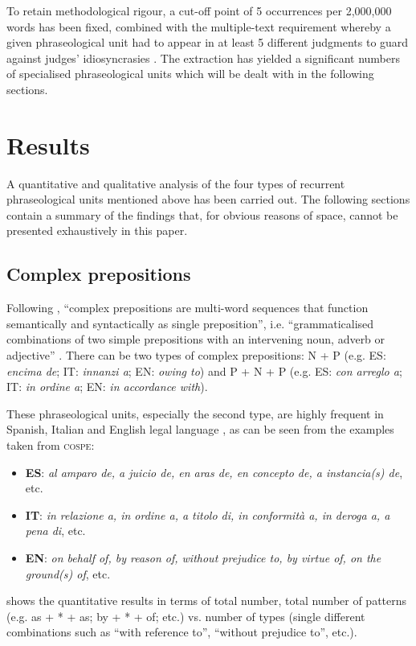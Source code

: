 \documentclass[output=paper]{LSP/langsci}
\begin{document}
To retain methodological rigour, a cut-off point of 5 occurrences per 2,000,000 words has been fixed, combined with the multiple-text requirement whereby a given phraseological unit had to appear in at least 5 different judgments to guard against judges’ idiosyncrasies \citep[110]{GozdzRoszkowski2011}.
The extraction has yielded a significant numbers of specialised phraseological units which will be dealt with in the following sections.

\section{Results}
A quantitative and qualitative analysis of the four types of recurrent phraseological units mentioned above has been carried out. The following sections contain a summary of the findings that, for obvious reasons of space, cannot be presented exhaustively in this paper.
\subsection{Complex prepositions}
Following \citet[75]{Biber1999}, “complex prepositions are multi-word sequences that function semantically and syntactically as single preposition”, i.e. “grammaticalised combinations of two simple prepositions with an intervening noun, adverb or adjective” \citep[44]{Granger2008}. There can be two types of complex prepositions: N + P (e.g. ES: \textit{encima de}; IT: \textit{innanzi a}; EN: \textit{owing to}) and P + N + P (e.g. ES: \textit{con arreglo a}; IT: \textit{in ordine a}; EN: \textit{in accordance with}).

These phraseological units, especially the second type, are highly frequent in Spanish, Italian and English legal language \citep[see][]{Pontrandolfo2013b}, as can be seen from the examples taken from \textsc{cospe}:

\begin{itemize}
\item \textbf{ES}: \textit{al amparo de, a juicio de, en aras de, en concepto de, a instancia(s) de}, etc.
\item \textbf{IT}: \textit{in relazione a, in ordine a, a titolo di, in conformità a, in deroga a, a pena di}, etc.
\item \textbf{EN}: \textit{on behalf of, by reason of, without prejudice to, by virtue of, on the ground(s) of}, etc.
\end{itemize}

 shows the quantitative results in terms of total number, total number of patterns (e.g. as + * + as; by + * + of; etc.) vs. number of types (single different combinations such as “with reference to”, “without prejudice to”, etc.).
\end{document}
